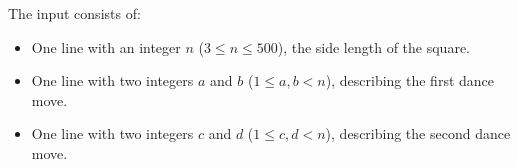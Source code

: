 
  The input consists of:
  \begin{itemize}
    \item One line with an integer $n$ ($3\leq n\leq 500$), the side length of the square.
    \item One line with two integers $a$ and $b$ ($1\leq a, b < n$), describing the first dance move.
    \item One line with two integers $c$ and $d$ ($1\leq c, d < n$), describing the second dance move.
  \end{itemize}
